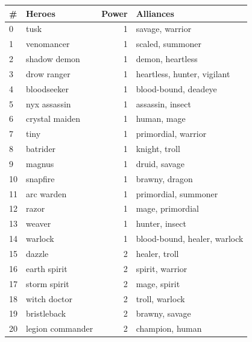 \documentclass{article}
\begin{document}
\begin{table}
\center
\resizebox{!}{9cm} {
\begin{tabular}{llrl}
{\#} &                 Heroes &  Power &                       Alliances \\
\midrule
0  &                 tusk &      1 &               savage, warrior  \\
1  &           venomancer &      1 &               scaled, summoner \\
2  &         shadow demon &      1 &               demon, heartless \\
3  &          drow ranger &      1 &    heartless, hunter, vigilant \\
4  &          bloodseeker &      1 &           blood-bound, deadeye \\
5  &         nyx assassin &      1 &               assassin, insect \\
6  &       crystal maiden &      1 &                    human, mage \\
7  &                 tiny &      1 &           primordial, warrior  \\
8  &             batrider &      1 &                  knight, troll \\
9  &               magnus &      1 &                  druid, savage \\
10 &             snapfire &      1 &                 brawny, dragon \\
11 &           arc warden &      1 &           primordial, summoner \\
12 &                razor &      1 &               mage, primordial \\
13 &               weaver &      1 &                 hunter, insect \\
14 &              warlock &      1 &  blood-bound, healer, warlock  \\
15 &               dazzle &      2 &                  healer, troll \\
16 &         earth spirit &      2 &               spirit, warrior  \\
17 &         storm spirit &      2 &                   mage, spirit \\
18 &         witch doctor &      2 &                troll, warlock  \\
19 &          bristleback &      2 &                 brawny, savage \\
20 &     legion commander &      2 &                champion, human \\

\end{tabular}}
\end{table}
\end{document}
